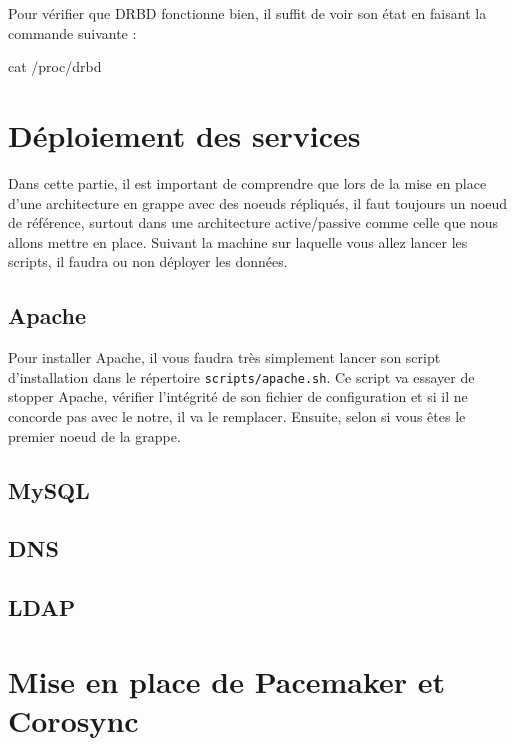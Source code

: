 \documentclass[11pt,a4paper]{report}
\begin{document}
                Pour vérifier que DRBD fonctionne bien, il suffit de voir son état en faisant la commande suivante :\\
                
                \begin{bashcode}
                    cat /proc/drbd
                \end{bashcode}
                
        \section{Déploiement des services}
            
            Dans cette partie, il est important de comprendre que lors de la mise en place d'une architecture en grappe avec des noeuds répliqués, il faut toujours un noeud de référence, surtout dans une architecture active/passive comme celle que nous allons mettre en place.
            Suivant la machine sur laquelle vous allez lancer les scripts, il faudra ou non déployer les données.
        
            \subsection{Apache}
                
                Pour installer Apache, il vous faudra très simplement lancer son script d'installation dans le répertoire \verb+scripts/apache.sh+.
                Ce script va essayer de stopper Apache, vérifier l'intégrité de son fichier de configuration et si il ne concorde pas avec le notre, il va le remplacer. Ensuite, selon si vous êtes le premier noeud de la grappe.
                
            \subsection{MySQL}
            \subsection{DNS}
            \subsection{LDAP}
        \section{Mise en place de Pacemaker et Corosync}
            
\end{document}

